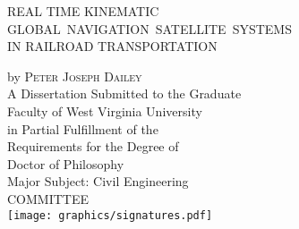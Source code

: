 \thispagestyle{empty}
\begin{center}
	\large{ REAL TIME KINEMATIC\\
	\mbox{GLOBAL NAVIGATION SATELLITE SYSTEMS}\\
	IN RAILROAD TRANSPORTATION}\\
	 \end{center}
\begin{center}
\vspace{6pt}
by
\textsc{Peter Joseph Dailey}\\
\SingleSpacing A Dissertation Submitted to the Graduate\\
Faculty of West Virginia University\\
in Partial Fulfillment of the\\
Requirements for the Degree of\\
Doctor of Philosophy\\
Major Subject: Civil Engineering
\vspace{10pt}\\
COMMITTEE\\ 
\vspace{20pt}
\texttt{[image: graphics/signatures.pdf]}
\end{center}